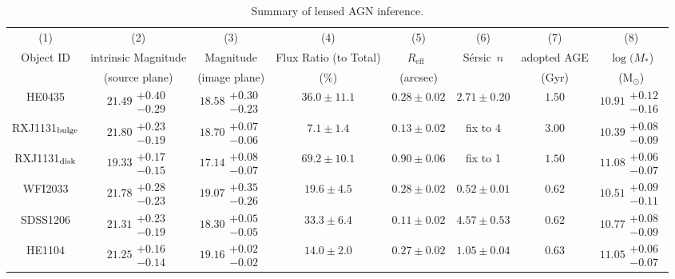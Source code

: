 \documentclass[fleqn,usenatbib]{mnras}
\newcommand{\sersic}{S\'ersic}
\newcommand{\reff}{{$R_{\mathrm{eff}}$}}
\begin{document}
\begin{table}
\renewcommand{\arraystretch}{1.25}
\centering
  \begin{threeparttable}
\caption{Summary of lensed AGN inference.}\label{tab:host_measure}    
     \begin{tabular}{cccccccc}
\hline     
(1) & (2) & (3) & (4) & (5) & (6) & (7) & (8) \\    
Object ID & intrinsic Magnitude & Magnitude & Flux Ratio (to Total) & \reff\ & \sersic\ $n$ & adopted AGE & $\log (M_{*}$)  \\
 & (source plane) & (image plane) & ($\%$) & (arcsec) & & (Gyr) & (M$_{\odot}$) \\ \hline
HE0435 & $21.49\substack{+0.40\\-0.29}$ & $18.58\substack{+0.30\\-0.23}$ & $36.0\pm11.1$ & $0.28\pm0.02$ & $2.71\pm0.20$ & $1.50$ & $10.91\substack{+0.12\\-0.16}$ \\
RXJ1131$_{\rm bulge}$ & $21.80\substack{+0.23\\-0.19}$ & $18.70\substack{+0.07\\-0.06}$ & $7.1\pm1.4$ & $0.13\pm0.02$ & fix to 4 & $3.00$ & $10.39\substack{+0.08\\-0.09}$ \\
RXJ1131$_{\rm disk}$ & $19.33\substack{+0.17\\-0.15}$ & $17.14\substack{+0.08\\-0.07}$ & $69.2\pm10.1$ & $0.90\pm0.06$ & fix to 1 & $1.50$ & $11.08\substack{+0.06\\-0.07}$ \\
WFI2033 & $21.78\substack{+0.28\\-0.23}$ & $19.07\substack{+0.35\\-0.26}$ & $19.6\pm4.5$ & $0.28\pm0.02$ & $0.52\pm0.01$ & $0.62$ & $10.51\substack{+0.09\\-0.11}$ \\
SDSS1206 & $21.31\substack{+0.23\\-0.19}$ & $18.30\substack{+0.05\\-0.05}$ & $33.3\pm6.4$ & $0.11\pm0.02$ & $4.57\pm0.53$ & $0.62$ & $10.77\substack{+0.08\\-0.09}$ \\
HE1104 & $21.25\substack{+0.16\\-0.14}$ & $19.16\substack{+0.02\\-0.02}$ & $14.0\pm2.0$ & $0.27\pm0.02$ & $1.05\pm0.04$ & $0.63$ & $11.05\substack{+0.06\\-0.07}$ \\

\end{tabular}
\end{threeparttable}
\end{table}
\end{document}
